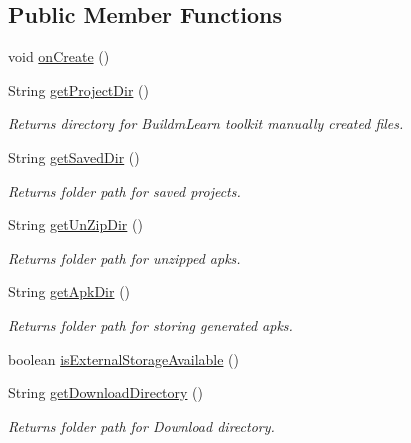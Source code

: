 \subsection*{Public Member Functions}
\begin{DoxyCompactItemize}
\item 
void \hyperlink{classorg_1_1buildmlearn_1_1toolkit_1_1ToolkitApplication_a4703aa50081e8b7996b0525e60fc2c1e}{on\-Create} ()
\item 
String \hyperlink{classorg_1_1buildmlearn_1_1toolkit_1_1ToolkitApplication_a3ae286df3a66b894f4bff0c4da53ceff}{get\-Project\-Dir} ()
\begin{DoxyCompactList}\small\item\em Returns directory for Buildm\-Learn toolkit manually created files. \end{DoxyCompactList}\item 
String \hyperlink{classorg_1_1buildmlearn_1_1toolkit_1_1ToolkitApplication_a5f6a7d373de5d6d2c7cfacc9e6c86f47}{get\-Saved\-Dir} ()
\begin{DoxyCompactList}\small\item\em Returns folder path for saved projects. \end{DoxyCompactList}\item 
String \hyperlink{classorg_1_1buildmlearn_1_1toolkit_1_1ToolkitApplication_a4f504e66f421dfc2f9dfd6810c2a86cb}{get\-Un\-Zip\-Dir} ()
\begin{DoxyCompactList}\small\item\em Returns folder path for unzipped apks. \end{DoxyCompactList}\item 
String \hyperlink{classorg_1_1buildmlearn_1_1toolkit_1_1ToolkitApplication_a976b0d6036419bd9382ffdca98b79fb4}{get\-Apk\-Dir} ()
\begin{DoxyCompactList}\small\item\em Returns folder path for storing generated apks. \end{DoxyCompactList}\item 
boolean \hyperlink{classorg_1_1buildmlearn_1_1toolkit_1_1ToolkitApplication_a7a355329da403f899f5ae1a769a51027}{is\-External\-Storage\-Available} ()
\item 
String \hyperlink{classorg_1_1buildmlearn_1_1toolkit_1_1ToolkitApplication_ab9cd5e8da6ff1a82eafee60edb626e0d}{get\-Download\-Directory} ()
\begin{DoxyCompactList}\small\item\em Returns folder path for Download directory. \end{DoxyCompactList}\end{DoxyCompactItemize}


